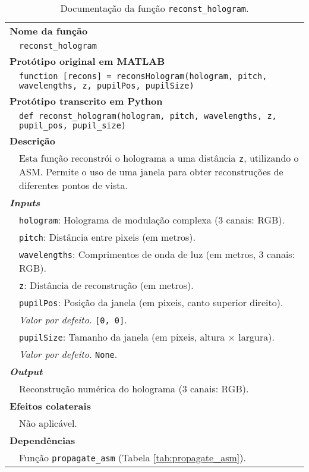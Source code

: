 \begin{table}[!hp]
    \centering
    \caption{Documentação da função \texttt{reconst\_hologram}.}
    \label{tab:reconst_hologram}
    \begin{tabular}{p{1cm} p{11.5cm}}
        \hline
        \multicolumn{2}{l}{\bfseries\small Nome da função}\\
         & \verb|reconst_hologram|\\
        \hline
        \multicolumn{2}{l}{\bfseries\small Protótipo original em MATLAB}\\
         & \texttt{function [recons] = reconsHologram(hologram, pitch, wavelengths, z, pupilPos, pupilSize)
         }\\
        \hline
        \multicolumn{2}{l}{\bfseries\small Protótipo transcrito em Python}\\
         & \texttt{def reconst_hologram(hologram, pitch, wavelengths, z, pupil_pos, pupil_size)} \\
        \hline\multicolumn{2}{l}{\bfseries\small Descrição}\\
         & Esta função reconstrói o holograma a uma distância \verb|z|, utilizando o \ac{ASM}. Permite o uso de uma janela para obter reconstruções de diferentes pontos de vista.\\
        \hline\multicolumn{2}{l}{\bfseries\small \textit{Inputs}}\\
         & \verb|hologram|: Holograma de modulação complexa (3 canais: \ac{RGB}). \\
         & \verb|pitch|: Distância entre pixeis (em metros).\\
         & \verb|wavelengths|: Comprimentos de onda de luz (em metros, 3 canais: \ac{RGB}).\\
         & \verb|z|: Distância de reconstrução (em metros).\\
         & \verb|pupilPos|: Posição da janela (em pixeis, canto superior direito).\\
         & \hspace{1cm} \textit{Valor por defeito.} \verb|[0, 0]|.\\
         & \verb|pupilSize|: Tamanho da janela (em pixeis, altura $\times$ largura).\\
         & \hspace{1cm} \textit{Valor por defeito.} \verb|None|.\\
        \hline\multicolumn{2}{l}{\bfseries\small \textit{Output}}\\
         & Reconstrução numérica do holograma (3 canais: \ac{RGB}).\\
        \hline\multicolumn{2}{l}{\bfseries\small Efeitos colaterais}\\
         & Não aplicável. \\
        \hline\multicolumn{2}{l}{\bfseries\small Dependências}\\
         & Função \verb|propagate_asm| (Tabela \ref{tab:propagate_asm}). \\
        \hline
    \end{tabular}
\end{table}



